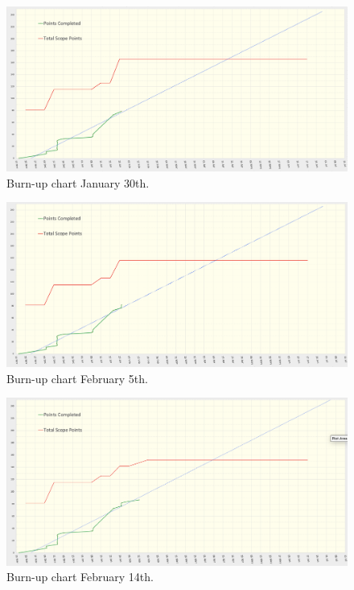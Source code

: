     \begin{figure}[H]
      \centering
      \includegraphics[width=12cm]{assets/outputs/burnups/01-30.png}
      \caption{Burn-up chart January 30th.}
      \label{fig:burnup2}
    \end{figure}
  
    \begin{figure}[H]
      \centering
      \includegraphics[width=12cm]{assets/outputs/burnups/02-05.png}
      \caption{Burn-up chart February 5th.}
      \label{fig:burnup3}
    \end{figure}
  
    \begin{figure}[H]
      \centering
      \includegraphics[width=12cm]{assets/outputs/burnups/02-14.png}
      \caption{Burn-up chart February 14th.}
      \label{fig:burnup4}
    \end{figure}
  
